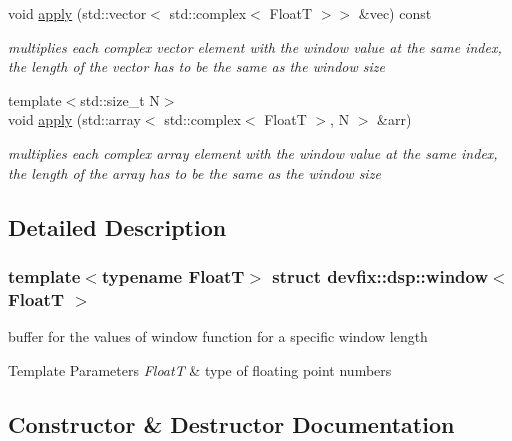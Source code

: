 \begin{DoxyCompactItemize}
void \hyperlink{structdevfix_1_1dsp_1_1window_a7d9fb193d2286f50aabc2ea0243a5465}{apply} (std\+::vector$<$ std\+::complex$<$ FloatT $>$$>$ \&vec) const
\begin{DoxyCompactList}\small\item\em multiplies each complex vector element with the window value at the same index, the length of the vector has to be the same as the window size \end{DoxyCompactList}\item 
{\footnotesize template$<$std\+::size\+\_\+t N$>$ }\\void \hyperlink{structdevfix_1_1dsp_1_1window_a3b101f8761a003d0bdbd90c6f1de2183}{apply} (std\+::array$<$ std\+::complex$<$ FloatT $>$, N $>$ \&arr)
\begin{DoxyCompactList}\small\item\em multiplies each complex array element with the window value at the same index, the length of the array has to be the same as the window size \end{DoxyCompactList}\end{DoxyCompactItemize}


\subsection{Detailed Description}
\subsubsection*{template$<$typename FloatT$>$\newline
struct devfix\+::dsp\+::window$<$ Float\+T $>$}

buffer for the values of window function for a specific window length 


\begin{DoxyTemplParams}{Template Parameters}
{\em FloatT} & type of floating point numbers \\
\hline
\end{DoxyTemplParams}


\subsection{Constructor \& Destructor Documentation}
\mbox{\label{structdevfix_1_1dsp_1_1window_a9a95322d9d9547f393e528cdfe3ec2aa}} 
